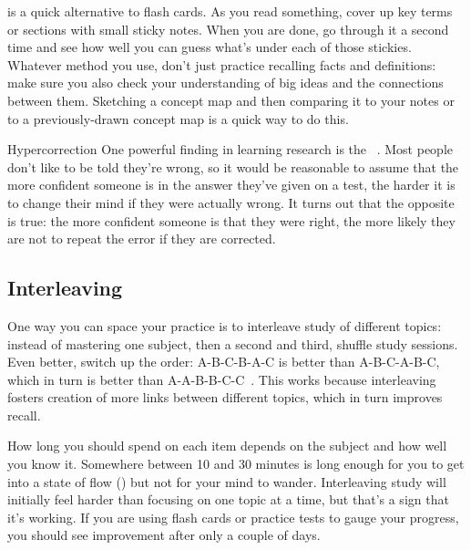 is a quick alternative to flash cards.
As you read something,
cover up key terms or sections with small sticky notes.
When you are done,
go through it a second time and see how well you can guess what's under each of those stickies.
Whatever method you use,
don't just practice recalling facts and definitions:
make sure you also check your understanding of big ideas
and the connections between them.
Sketching a concept map and then comparing it to your notes
or to a previously-drawn concept map
is a quick way to do this.

\begin{aside}{Hypercorrection}
  One powerful finding in learning research is
  the ~\cite{Metc2016}.
  Most people don't like to be told they're wrong,
  so it would be reasonable to assume that
  the more confident someone is in the answer they've given on a test,
  the harder it is to change their mind if they were actually wrong.
  It turns out that the opposite is true:
  the more confident someone is that they were right,
  the more likely they are not to repeat the error if they are corrected.
\end{aside}

\subsection*{Interleaving}

One way you can space your practice is to interleave study of different topics:
instead of mastering one subject,
then a second and third,
shuffle study sessions.
Even better,
switch up the order:
A-B-C-B-A-C is better than A-B-C-A-B-C,
which in turn is better than A-A-B-B-C-C~\cite{Rohr2015}.
This works because interleaving fosters creation of more links between different topics,
which in turn improves recall.

How long you should spend on each item
depends on the subject and how well you know it.
Somewhere between 10 and 30 minutes is long enough for you to get into
a state of flow ()
but not for your mind to wander.
Interleaving study will initially feel harder than focusing on one topic at a time,
but that's a sign that it's working.
If you are using flash cards or practice tests to gauge your progress,
you should see improvement after only a couple of days.

